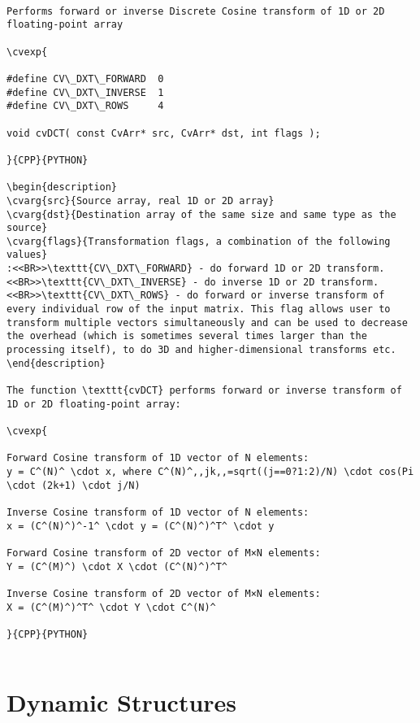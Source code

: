 \begin{verbatim}

Performs forward or inverse Discrete Cosine transform of 1D or 2D floating-point array

\cvexp{

#define CV\_DXT\_FORWARD  0
#define CV\_DXT\_INVERSE  1
#define CV\_DXT\_ROWS     4

void cvDCT( const CvArr* src, CvArr* dst, int flags );

}{CPP}{PYTHON}

\begin{description}
\cvarg{src}{Source array, real 1D or 2D array}
\cvarg{dst}{Destination array of the same size and same type as the source}
\cvarg{flags}{Transformation flags, a combination of the following values}
:<<BR>>\texttt{CV\_DXT\_FORWARD} - do forward 1D or 2D transform.<<BR>>\texttt{CV\_DXT\_INVERSE} - do inverse 1D or 2D transform.<<BR>>\texttt{CV\_DXT\_ROWS} - do forward or inverse transform of every individual row of the input matrix. This flag allows user to transform multiple vectors simultaneously and can be used to decrease the overhead (which is sometimes several times larger than the processing itself), to do 3D and higher-dimensional transforms etc.
\end{description}

The function \texttt{cvDCT} performs forward or inverse transform of 1D or 2D floating-point array:

\cvexp{

Forward Cosine transform of 1D vector of N elements:
y = C^(N)^ \cdot x, where C^(N)^,,jk,,=sqrt((j==0?1:2)/N) \cdot cos(Pi \cdot (2k+1) \cdot j/N)

Inverse Cosine transform of 1D vector of N elements:
x = (C^(N)^)^-1^ \cdot y = (C^(N)^)^T^ \cdot y

Forward Cosine transform of 2D vector of M×N elements:
Y = (C^(M)^) \cdot X \cdot (C^(N)^)^T^

Inverse Cosine transform of 2D vector of M×N elements:
X = (C^(M)^)^T^ \cdot Y \cdot C^(N)^

}{CPP}{PYTHON}


\end{verbatim}
\section{Dynamic Structures}
\begin{verbatim}


\end{verbatim}
